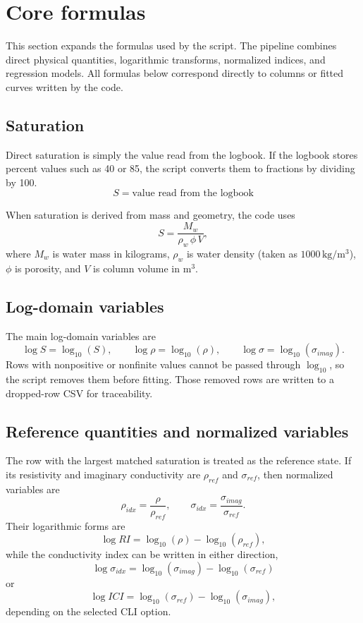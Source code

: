 \documentclass[11pt]{article}
\begin{document}
\section{Core formulas}
This section expands the formulas used by the script. The pipeline combines direct physical quantities, logarithmic transforms, normalized indices, and regression models. All formulas below correspond directly to columns or fitted curves written by the code.

\subsection{Saturation}
Direct saturation is simply the value read from the logbook. If the logbook stores percent values such as 40 or 85, the script converts them to fractions by dividing by 100.
\[
S = \text{value read from the logbook}
\]

When saturation is derived from mass and geometry, the code uses
\[
S = \frac{M_w}{\rho_w\,\phi\,V},
\]
where $M_w$ is water mass in kilograms, $\rho_w$ is water density (taken as $1000\,\mathrm{kg/m^3}$), $\phi$ is porosity, and $V$ is column volume in $\mathrm{m^3}$.

\subsection{Log-domain variables}
The main log-domain variables are
\[
\log S = \log_{10}(S), \qquad
\log \rho = \log_{10}(\rho), \qquad
\log \sigma = \log_{10}(\sigma_{imag}).
\]
Rows with nonpositive or nonfinite values cannot be passed through $\log_{10}$, so the script removes them before fitting. Those removed rows are written to a dropped-row CSV for traceability.

\subsection{Reference quantities and normalized variables}
The row with the largest matched saturation is treated as the reference state. If its resistivity and imaginary conductivity are $\rho_{ref}$ and $\sigma_{ref}$, then normalized variables are
\[
\rho_{idx} = \frac{\rho}{\rho_{ref}}, \qquad
\sigma_{idx} = \frac{\sigma_{imag}}{\sigma_{ref}}.
\]
Their logarithmic forms are
\[
\log RI = \log_{10}(\rho) - \log_{10}(\rho_{ref}),
\]
while the conductivity index can be written in either direction,
\[
\log \sigma_{idx} = \log_{10}(\sigma_{imag}) - \log_{10}(\sigma_{ref})
\]
or
\[
\log ICI = \log_{10}(\sigma_{ref}) - \log_{10}(\sigma_{imag}),
\]
depending on the selected CLI option.
\end{document}
